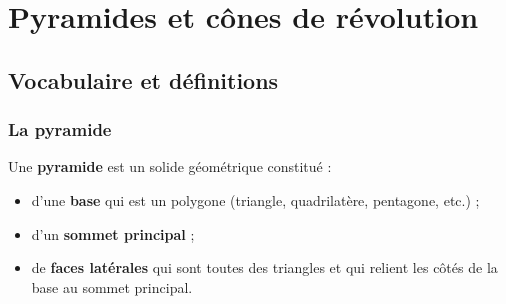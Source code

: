 \documentclass[a4paper]{book}
\begin{document}
\setcounter{chapter}{14} %
\renewcommand{\monTitre}{Pyramides et cônes de révolution}
\chapter{\monTitre}
\thispagestyle{fancy}

\section{Vocabulaire et définitions}

\subsection{La pyramide}
    \begin{definition}
        Une \textbf{pyramide} est un solide géométrique constitué :
        \begin{itemize}
            \item d'une \textbf{base} qui est un polygone (triangle, quadrilatère, pentagone, etc.) ;
            \item d'un \textbf{sommet principal} ;
            \item de \textbf{faces latérales} qui sont toutes des triangles et qui relient les côtés de la base au sommet principal.
        \end{itemize}
    \end{definition}
    
\end{document}

